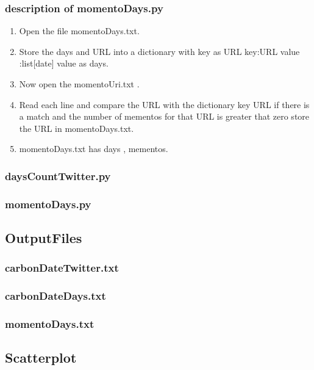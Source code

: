 \documentclass[12pt]{article}
\begin{document}
\subsubsection{description of momentoDays.py}
\begin{enumerate}
	\item Open the file momentoDays.txt.
	\item Store the days and URL into a dictionary with key as URL {key:URL value :list[date]} value as days.	
	\item Now open the momentoUri.txt .
	\item Read each line and compare the URL with the dictionary key URL if there is a match and the number of mementos for that URL is greater that zero store the URL in momentoDays.txt.
	\item momentoDays.txt has days , mementos.
\end{enumerate}

\newpage
\subsubsection{daysCountTwitter.py}

\newpage
\subsubsection{momentoDays.py}

\newpage
\subsection{OutputFiles}
\subsubsection{carbonDateTwitter.txt}

\subsubsection{carbonDateDays.txt}

\subsubsection{momentoDays.txt}

\newpage


\subsection{Scatterplot}
\end{document}
